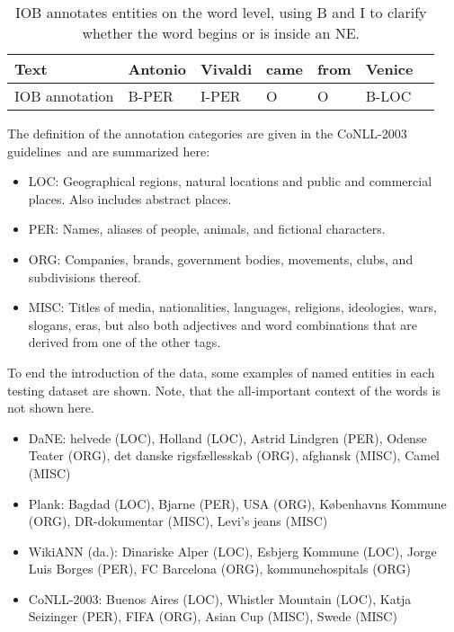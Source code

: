 \documentclass[main.tex]{subfiles}
\begin{document}
\begin{table}[H]
    \centering
    \begin{tabular}{l|llllll}
        Text              & Antonio & Vivaldi & came & from & Venice\\\hline
        IOB annotation    & B-PER   & I-PER   &  O   & O    & B-LOC   \\
    \end{tabular}
    \caption{
        IOB annotates entities on the word level, using B and I to clarify whether the word begins or is inside an NE.
    }
    \label{tab:iob-ex}
\end{table}\noindent
The definition of the annotation categories are given in the CoNLL-2003 guidelines\footnotemark~and are summarized here:
\begin{itemize}
    \item LOC: Geographical regions, natural locations and public and commercial places. Also includes abstract places.
    \item PER: Names, aliases of people, animals, and fictional characters.
    \item ORG: Companies, brands, government bodies, movements, clubs, and subdivisions thereof.
    \item MISC: Titles of media, nationalities, languages, religions, ideologies, wars, slogans, eras, but also both adjectives and word combinations that are derived from one of the other tags.
\end{itemize}
To end the introduction of the data, some examples of named entities in each testing dataset are shown.
Note, that the all-important context of the words is not shown here.
\begin{itemize}
    \item DaNE: helvede (LOC), Holland (LOC), Astrid Lindgren (PER), Odense Teater (ORG), det danske rigsfællesskab (ORG), afghansk (MISC), Camel (MISC)
    \item Plank: Bagdad (LOC), Bjarne (PER), USA (ORG), Københavns Kommune (ORG), DR-dokumentar (MISC), Levi's jeans (MISC)
    \item WikiANN (da.): Dinariske Alper (LOC), Esbjerg Kommune (LOC), Jorge Luis Borges (PER), FC Barcelona (ORG), kommunehospitals (ORG)
    \item CoNLL-2003: Buenos Aires (LOC), Whistler Mountain (LOC), Katja Seizinger (PER),  FIFA (ORG), Asian Cup (MISC), Swede (MISC)
\end{itemize}
\end{document}
